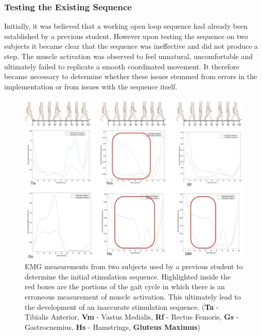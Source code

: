 \subsubsection{Testing the Existing Sequence}
Initially, it was believed that a working open loop sequence had already been established by a previous student. However upon testing the sequence on two  subjects it became clear that the sequence was ineffective and did not produce a step. The muscle activation was observed to feel unnatural, uncomfortable and ultimately failed to replicate a smooth coordinated movement. It therefore became necessary to determine whether these issues stemmed from errors in the implementation or from issues with the sequence itself.

\begin{figure} [h]
    \centering
    \includegraphics[width=0.99\linewidth]{images/wrongemg.png}
    \caption{EMG measurements from two subjects used by a previous student to determine the initial stimulation sequence. Highlighted inside the red boxes are the portions of the gait cycle in which there is an erroneous measurement of muscle activation. This ultimately lead to the development of an inaccurate stimulation sequence. (\textbf{Ta} - Tibialis Anterior, \textbf{Vm} - Vastus Medialis, \textbf{Rf} - Rectus Femoris, \textbf{Gs} - Gastrocnemius, \textbf{Hs} - Hamstrings, \textbf{Gluteus Maximus})}
    \label{fig:wrongemg}
\end{figure}

